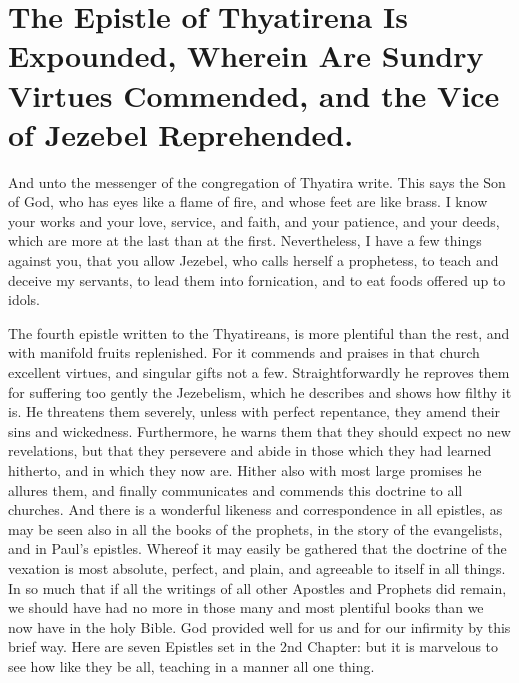 \chapter[Sermon 12. The Epistle of Thyatirena Is Expounded, Wherein Are Sundry Virtues Commended, and the Vice of Jezebel Reprehended.]{The Epistle of Thyatirena Is Expounded, Wherein Are Sundry Virtues Commended, and the Vice of Jezebel Reprehended.}
\label{sermon:012}

And unto the messenger of the congregation of Thyatira write. This says the Son of God, who has eyes like a flame of fire, and whose feet are like brass. I know your works and your love, service, and faith, and your patience, and your deeds, which are more at the last than at the first. Nevertheless, I have a few things against you, that you allow Jezebel, who calls herself a prophetess, to teach and deceive my servants, to lead them into fornication, and to eat foods offered up to idols.

The fourth epistle written to the Thyatireans, is more plentiful than the rest, and with manifold fruits replenished. For it commends and praises in that church excellent virtues, and singular gifts not a few. Straightforwardly he reproves them for suffering too gently the Jezebelism, which he describes and shows how filthy it is. He threatens them severely, unless with perfect repentance, they amend their sins and wickedness. Furthermore, he warns them that they should expect no new revelations, but that they persevere and abide in those which they had learned hitherto, and in which they now are. Hither also with most large promises he allures them, and finally communicates and commends this doctrine to all churches. And there is a wonderful likeness and correspondence in all epistles, as may be seen also in all the books of the prophets, in the story of the evangelists, and in Paul’s epistles. Whereof it may easily be gathered that the doctrine of the vexation is most absolute, perfect, and plain, and agreeable to itself in all things. In so much that if all the writings of all other Apostles and Prophets did remain, we should have had no more in those many and most plentiful books than we now have in the holy Bible. God provided well for us and for our infirmity by this brief way. Here are seven Epistles set in the 2nd Chapter: but it is marvelous to see how like they be all, teaching in a manner all one thing.

